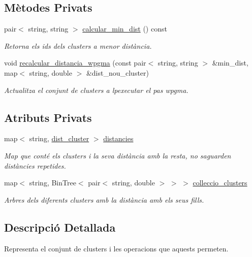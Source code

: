 \subsection*{Mètodes Privats}
\begin{DoxyCompactItemize}
\item 
pair$<$ string, string $>$ \hyperlink{class_cjt__clusters_afe0ecfc740e82c1c00f549ef12279673}{calcular\+\_\+min\+\_\+dist} () const
\begin{DoxyCompactList}\small\item\em Retorna els ids dels clusters a menor distància. \end{DoxyCompactList}\item 
void \hyperlink{class_cjt__clusters_a208f3642fdfe3c3ba9eacc659918f6fa}{recalcular\+\_\+distancia\+\_\+wpgma} (const pair$<$ string, string $>$ \&min\+\_\+dist, map$<$ string, double $>$ \&dist\+\_\+nou\+\_\+cluster)
\begin{DoxyCompactList}\small\item\em Actualitza el conjunt de clusters a lpexecutar el pas wpgma. \end{DoxyCompactList}\end{DoxyCompactItemize}
\subsection*{Atributs Privats}
\begin{DoxyCompactItemize}
\item 
map$<$ string, \hyperlink{class_cjt__clusters_a9138a363184004ad38221f340abfccd5}{dist\+\_\+cluster} $>$ \hyperlink{class_cjt__clusters_a8e94e53830e3224d791dcf7dbd0a6082}{distancies}
\begin{DoxyCompactList}\small\item\em Map que conté els clusters i la seva distància amb la resta, no s\textquotesingle{}aguarden distàncies repetides. \end{DoxyCompactList}\item 
map$<$ string, Bin\+Tree$<$ pair$<$ string, double $>$ $>$ $>$ \hyperlink{class_cjt__clusters_aea7d6362517dd16cbd12736a3da50021}{colleccio\+\_\+clusters}
\begin{DoxyCompactList}\small\item\em Arbres dels diferents clusters amb la distància amb els seus fills. \end{DoxyCompactList}\end{DoxyCompactItemize}


\subsection{Descripció Detallada}
Representa el conjunt de clusters i les operacions que aquests permeten. 


